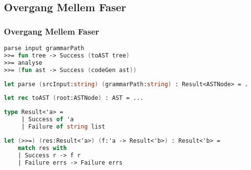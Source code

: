 \subsection{Overgang Mellem Faser}
\begin{frame}[fragile]
  \frametitle{Overgang Mellem Faser}
  \begin{lstlisting}[language=fsharp]
parse input grammarPath 
>>= fun tree -> Success (toAST tree)
>>= analyse
>>= (fun ast -> Success (codeGen ast))
  \end{lstlisting}

  \begin{lstlisting}[language=fsharp]
let parse (srcInput:string) (grammarPath:string) : Result<ASTNode> = ...
  \end{lstlisting}

  \begin{lstlisting}[language=fsharp]
let rec toAST (root:ASTNode) : AST = ...
  \end{lstlisting}

  \begin{lstlisting}[language=fsharp]
type Result<'a> =
     | Success of 'a
     | Failure of string list
  \end{lstlisting}

  \begin{lstlisting}[language=fsharp]
let (>>=) (res:Result<'a>) (f:'a -> Result<'b>) : Result<'b> =
    match res with
    | Success r -> f r
    | Failure errs -> Failure errs
  \end{lstlisting}

  

\end{frame}

